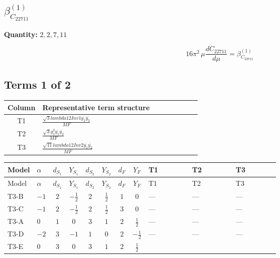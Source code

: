 \documentclass[8pt]{article}
\begin{document}
\begin{landscape}
\section*{$\beta_{C_{22711}}^{(1)}$}
\noindent\textbf{Quantity: }$\mathrm{2,2,7,11}$\par\smallskip
\[16\pi^2\,\mu\frac{d C_{22711}}{d\mu}=\beta_{C_{22711}}^{(1)}\]
\subsection*{Terms 1 of 2}
\begin{center}
\begin{tabular}{@{}c >{\raggedright\arraybackslash}p{0.82\linewidth}@{}}
\toprule
Column & Representative term structure \\
\midrule
T1 & \(\displaystyle \frac{\sqrt{3} lambda12Inv1 \overline{y_{1}} \overline{y_{2}}}{MF}\) \\
\midrule
T2 & \(\displaystyle \frac{\sqrt{3} g_{1}^{2} \overline{y_{1}} \overline{y_{2}}}{MF}\) \\
\midrule
T3 & \(\displaystyle \frac{\sqrt{11} lambda12Inv2 \overline{y_{1}} \overline{y_{2}}}{MF}\) \\
\midrule
\bottomrule
\end{tabular}
\end{center}
\smallskip
\tiny
\begin{longtable}{@{}llcccccc >{\raggedright\arraybackslash}p{0.21\linewidth} >{\raggedright\arraybackslash}p{0.21\linewidth} >{\raggedright\arraybackslash}p{0.21\linewidth}@{}}
\toprule
Model & $\alpha$ & $d_{S_1}$ & $Y_{S_1}$ & $d_{S_2}$ & $Y_{S_2}$ & $d_F$ & $Y_F$ & T1 & T2 & T3 \\
\midrule
\endfirsthead
\toprule
Model & $\alpha$ & $d_{S_1}$ & $Y_{S_1}$ & $d_{S_2}$ & $Y_{S_2}$ & $d_F$ & $Y_F$ & T1 & T2 & T3 \\
\midrule
\endhead
T3-B & $-1$ & $2$ & $-\frac{1}{2}$ & $2$ & $\frac{1}{2}$ & $1$ & $0$ & --- & --- & --- \\
\midrule
T3-C & $-1$ & $2$ & $-\frac{1}{2}$ & $2$ & $\frac{1}{2}$ & $3$ & $0$ & --- & --- & --- \\
\midrule
T3-A & $0$ & $1$ & $0$ & $3$ & $1$ & $2$ & $\frac{1}{2}$ & --- & --- & --- \\
\midrule
T3-D & $-2$ & $3$ & $-1$ & $1$ & $0$ & $2$ & $-\frac{1}{2}$ & --- & --- & --- \\
\midrule
T3-E & $0$ & $3$ & $0$ & $3$ & $1$ & $2$ & $\frac{1}{2}$ & \scriptsize\adjustbox{max width=\linewidth}{$\begin{gathered} - \frac{\sqrt{3} lambda12Inv1 \overline{y_{1}} \overline{y_{2}}}{6 MF}\end{gathered}$} & \scriptsize\adjustbox{max width=\linewidth}{$\begin{gathered} \frac{\sqrt{3} g_{1}^{2} \overline{y_{1}} \overline{y_{2}}}{8 MF}\end{gathered}$} & \scriptsize\adjustbox{max width=\linewidth}{$\begin{gathered} \frac{3 \sqrt{11} lambda12Inv2 \overline{y_{1}} \overline{y_{2}}}{22 MF}\end{gathered}$} \\

\end{longtable}
\end{landscape}
\end{document}
